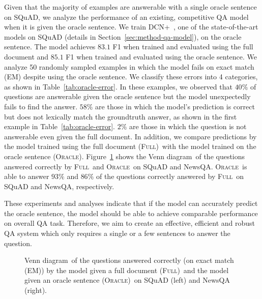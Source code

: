 \documentclass[11pt,a4paper]{article}
\newcommand{\full}{\textsc{Full}}
\newcommand{\oracle}{\textsc{Oracle}}
\newcommand{\fullshort}{(\textsc{Full})}
\newcommand{\oracleshort}{(\textsc{Oracle})}
\newcommand{\venndiagram}{Venn diagram}
\begin{document}
Given that the majority of examples are answerable with a single oracle sentence on SQuAD, we analyze the performance of an existing, competitive QA model when it is given the oracle sentence.
We train DCN+~\citep{dcn+}, one of the state-of-the-art models on SQuAD (details in Section~\ref{sec:method-qa-model}), on the oracle sentence.
The model achieves $83.1$ F1 when trained and evaluated using the full document and $85.1$ F1 when trained and evaluated using the oracle sentence.
We analyze 50 randomly sampled examples in which the model fails on exact match (EM) despite using the oracle sentence.
We classify these errors into 4 categories, as shown in Table~\ref{tab:oracle-error}.
In these examples, we observed that $40\%$ of questions are answerable given the oracle sentence but the model unexpectedly fails to find the answer.
$58\%$ are those in which the model's prediction is correct but does not lexically match the groundtruth answer, as shown in the first example in Table~\ref{tab:oracle-error}.
$2\%$ are those in which the question is not answerable even given the full document.
In addition, we compare predictions by the model trained using the full document \fullshort~with the model trained on the oracle sentence \oracleshort.
Figure~\ref{fig:full-and-oracle} shows the \venndiagram~of the questions answered correctly by \full~and \oracle~on SQuAD and NewsQA. \oracle~is able to answer $93\%$ and $86\%$ of the questions correctly answered by \full~on SQuAD and NewsQA, respectively.

These experiments and analyses indicate that if the model can accurately predict the oracle sentence, the model should be able to achieve comparable performance on overall QA task. 
Therefore, we aim to create an effective, efficient and robust QA system which only requires a single or a few sentences to answer the question.



\begin{figure}[!tb]
\centering
{}
\caption{
\venndiagram~of the questions answered correctly (on exact match (EM)) by the model given a full document \fullshort~and the model given an oracle sentence \oracleshort~on SQuAD (left) and NewsQA (right).
}
\label{fig:full-and-oracle}
\end{figure}
\end{document}
